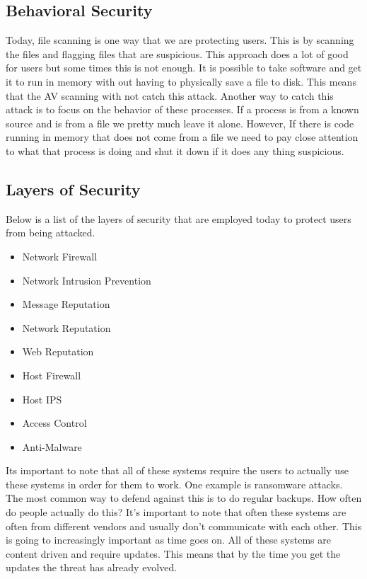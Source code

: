 \documentclass[letterpaper, onecolumn,10pt]{IEEEtran}
\begin{document}
            \subsection{Behavioral Security}
            Today, file scanning is one way that we are protecting users. This is by scanning the files and flagging files that are suspicious. This approach does a lot of good for users but some times this is not enough. It is possible to take software and get it to run in memory with out having to physically save a file to disk. This means that the AV scanning with not catch this attack. Another way to catch this attack is to focus on the behavior of these processes. If a process is from a known source and is from a file we pretty much leave it alone. However, If there is code running in memory that does not come from a file we need to pay close attention to what that process is doing and shut it down if it does any thing suspicious.\\
            
            \subsection{Layers of Security}
            Below is a list of the layers of security that are employed today to protect users from being attacked.
            \begin{itemize}
                \item Network Firewall
                \item Network Intrusion Prevention
                \item Message Reputation
                \item Network Reputation
                \item Web Reputation
                \item Host Firewall
                \item Host IPS
                \item Access Control
                \item Anti-Malware 
            \end{itemize}
            
            Its important to note that all of these systems require the users to actually use these systems in order for them to work. One example is ransomware attacks. The most common way to defend against this is to do regular backups. How often do people actually do this? It's important to note that often these systems are often from different vendors and usually don't communicate with each other. This is going to increasingly important as time goes on. All of these systems are content driven and require updates. This means that by the time you get the updates the threat has already evolved.\\
            
\end{document}
